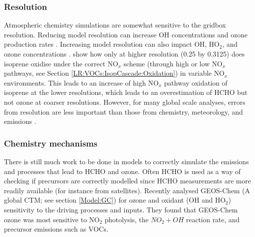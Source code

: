       
    \subsubsection{Resolution}
      \label{LR:Models:Uncert:Resolution}
      
      Atmospheric chemistry simulations are somewhat sensitive to the gridbox resolution.
      Reducing model resolution can increase OH concentrations and ozone production rates \parencite{Wild2006}.
      Increasing model resolution can also impact OH, HO$_2$, and ozone concentrations \parencite[e.g.][]{Christian2017}.
      \textcite{Yu2016} show how only at higher resolution (0.25 by 0.3125\degr) does isoprene oxidise under the correct NO$_x$ scheme (through high or low NO$_x$ pathways, see Section \ref{LR:VOCs:IsopCascade:Oxidation}) in variable NO$_x$ environments.
      This leads to an increase of high NO$_x$ pathway oxidation of isoprene at the lower resolutions, which leads to an overestimation of HCHO but not ozone at coarser resolutions.
      However, for many global scale analyses, errors from resolution are less important than those from chemistry, meteorology, and emissions \parencite{Christian2017, Christian2018}.
      
            
    \subsubsection{Chemistry mechanisms}
      \label{LR:Models:Uncert:Chemistry}
      There is still much work to be done in models to correctly simulate the emissions and processes that lead to HCHO and ozone.
      Often HCHO is used as a way of checking if precursors are correctly modelled since HCHO measurements are more readily available (for instance from satellites).
      Recently \textcite{Christian2017} analysed GEOS-Chem (A global CTM; see section \ref{Model:GC}) for ozone and oxidant (OH and HO$_2$) sensitivity to the driving processes and inputs.
      They found that GEOS-Chem ozone was most sensitive to NO$_2$ photolysis, the $NO_2 + OH$ reaction rate, and precursor emissions such as VOCs.

